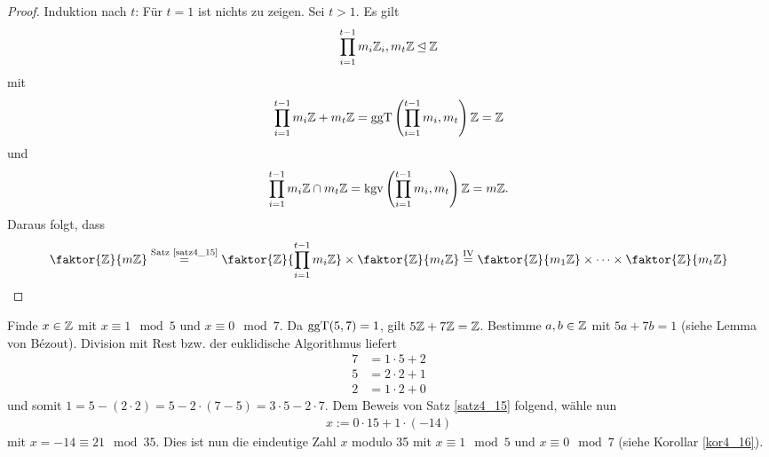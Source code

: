 \begin{proof}
	Induktion nach $t$: Für $t = 1$ ist nichts zu zeigen. Sei $ t > 1$. Es gilt 
	\begin{align*}
		\prod_{i=1}^{t-1} m_i \mathbb{Z}_i, m_t \mathbb{Z} \unlhd \mathbb{Z}
	\end{align*}
	mit
	\begin{align*}
		\prod_{i=1}^{t-1} m_i \mathbb{Z} + m_t \mathbb{Z} = \mathrm{ggT}\left(\prod_{i=1}^{t-1} m_i, m_t\right)\mathbb{Z} = \mathbb{Z}
	\end{align*}
	und
	\begin{align*}
		\prod_{i=1}^{t-1} m_i \mathbb{Z} \cap m_t \mathbb{Z} = \mathrm{kgv}\left(\prod_{i=1}^{t-1} m_i, m_t\right)\mathbb{Z} = m\mathbb{Z}.
	\end{align*}
	Daraus folgt, dass 
	\begin{align*}
		\faktor{\Z}{m\Z} \overset{\text{Satz \ref{satz4_15}}}{=} \faktor{\Z}{\prod_{i=1}^{t-1} m_i \Z} \times \faktor{\Z}{m_t \Z} \overset{\text{IV}}{=} \faktor{\Z}{m_1 \Z} \times \dots \times \faktor{\Z}{m_t \Z}
	\end{align*}
\end{proof}
\begin{beispiel}\label{beispiel4_17}
	Finde $x \in \mathbb{Z}$ mit $x \equiv 1 \mod 5$ und $x \equiv 0 \mod 7$. Da $\mathrm{ggT}(5,7) = 1$, gilt $5\mathbb{Z} + 7\mathbb{Z} = \mathbb{Z}$. Bestimme $a,b \in \mathbb{Z}$ mit $5a + 7b = 1$ (siehe Lemma von Bézout). Division mit Rest bzw. der euklidische Algorithmus liefert
	\begin{align*}
		7 &= 1 \cdot 5 + 2\\
		5 &= 2\cdot 2 + 1\\
		2 &= 1 \cdot 2 + 0
	\end{align*}
	und somit $1 = 5 - (2\cdot 2) = 5 - 2 \cdot (7-5) = 3 \cdot 5 - 2 \cdot 7$. Dem Beweis von Satz \ref{satz4_15} folgend, wähle nun
	\begin{align*}
		x := 0 \cdot 15 + 1 \cdot (-14)
	\end{align*} 
	mit $x = -14 \equiv 21 \mod 35$. Dies ist nun die eindeutige Zahl $x$ modulo 35 mit $x \equiv 1 \mod 5$ und $x \equiv 0 \mod 7$ (siehe Korollar \ref{kor4_16}).
\end{beispiel}